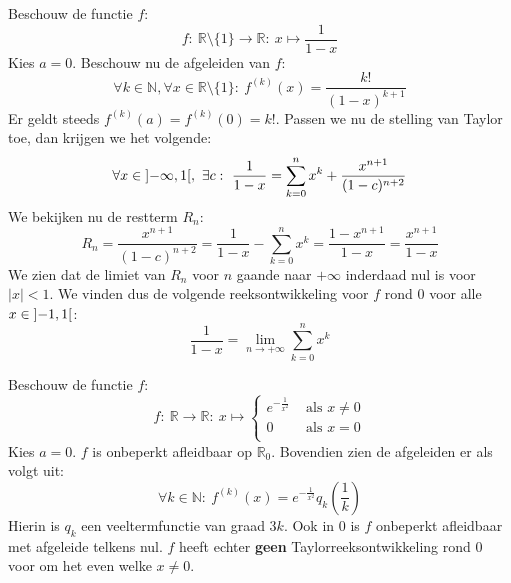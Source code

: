 \documentclass[main.tex]{subfiles}
\begin{document}
\begin{vb}
  Beschouw de functie $f$:
  \[ f:\ \mathbb{R} \setminus \{1\} \rightarrow \mathbb{R}:\ x \mapsto \frac{1}{1-x} \]
  Kies $a=0$.
  Beschouw nu de afgeleiden van $f$:
  \[ \forall k\in \mathbb{N}, \forall x\in \mathbb{R}\setminus\{1\}:\ f^{(k)}(x) = \frac{k!}{(1-x)^{k+1}} \]
  Er geldt steeds $f^{(k)}(a) = f^{(k)}(0) = k!$.
  Passen we nu de stelling van Taylor toe, dan krijgen we het volgende: 
  \[ \forall x\in \interval[open]{-\infty}{1},\ \exists c:\ \frac{1}{1-x} = \sum_{k=0}^{n}x^{k} + \frac{x^{n+1}}{(1-c)^{n+2}} \]
  We bekijken nu de restterm $R_{n}$:
  \[ R_{n} = \frac{x^{n+1}}{(1-c)^{n+2}} = \frac{1}{1-x}-\sum_{k=0}^{n}x^{k} = \frac{1-x^{n+1}}{1-x} = \frac{x^{n+1}}{1-x} \]
  We zien dat de limiet van $R_{n}$ voor $n$ gaande naar $+\infty$ inderdaad nul is voor $|x|<1$.
  We vinden dus de volgende reeksontwikkeling voor $f$ rond $0$ voor alle $x\in \interval[open]{-1}{1}$:
  \[ \frac{1}{1-x} = \lim_{n \rightarrow +\infty}\sum_{k=0}^{n}x^{k} \]
  \begin{figure}[H]
    \centering
  \end{figure}
\end{vb}

\begin{vb}
  Beschouw de functie $f$:
  \[ 
  f:\ \mathbb{R} \rightarrow \mathbb{R}:\ x \mapsto 
  \left\{
    \begin{array}{rl}
      e^{-\frac{1}{x^{2}}} & \text{ als } x \neq 0\\
      0 & \text{ als } x = 0\\
    \end{array}
  \right.
  \]
  Kies $a=0$.
  $f$ is onbeperkt afleidbaar op $\mathbb{R}_{0}$.
  Bovendien zien de afgeleiden er als volgt uit:
  \[ \forall k\in \mathbb{N}:\ f^{(k)}(x) = e^{-\frac{1}{x^{2}}}q_{k}\left(\frac{1}{k}\right) \]
  Hierin is $q_{k}$ een veeltermfunctie van graad $3k$.
  Ook in $0$ is $f$ onbeperkt afleidbaar met afgeleide telkens nul.
  $f$ heeft echter \textbf{geen} Taylorreeksontwikkeling rond $0$ voor om het even welke $x \neq 0$. 
\end{vb}
\end{document}
